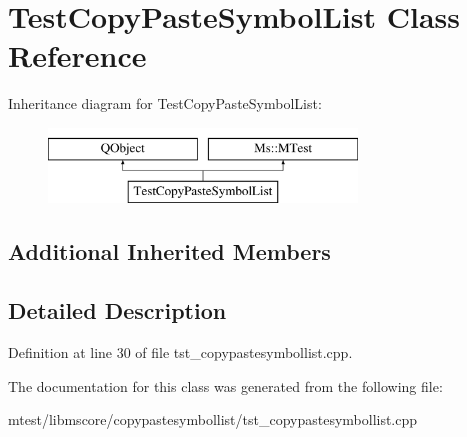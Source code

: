 \hypertarget{class_test_copy_paste_symbol_list}{}\section{Test\+Copy\+Paste\+Symbol\+List Class Reference}
\label{class_test_copy_paste_symbol_list}
Inheritance diagram for Test\+Copy\+Paste\+Symbol\+List\+:\begin{figure}[H]
\begin{center}
\leavevmode
\includegraphics[height=2.000000cm]{class_test_copy_paste_symbol_list}
\end{center}
\end{figure}
\subsection*{Additional Inherited Members}


\subsection{Detailed Description}


Definition at line 30 of file tst\+\_\+copypastesymbollist.\+cpp.



The documentation for this class was generated from the following file\+:\begin{DoxyCompactItemize}
\item 
mtest/libmscore/copypastesymbollist/tst\+\_\+copypastesymbollist.\+cpp\end{DoxyCompactItemize}
